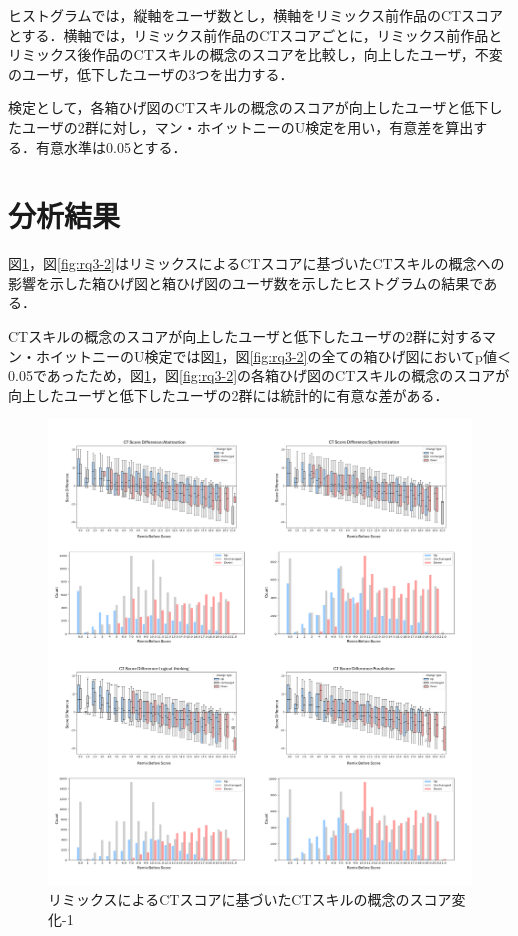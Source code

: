 \documentclass[11pt]{jreport}
\begin{document}
ヒストグラムでは，縦軸をユーザ数とし，横軸をリミックス前作品のCTスコアとする．横軸では，リミックス前作品のCTスコアごとに，リミックス前作品とリミックス後作品のCTスキルの概念のスコアを比較し，向上したユーザ，不変のユーザ，低下したユーザの3つを出力する．

検定として，各箱ひげ図のCTスキルの概念のスコアが向上したユーザと低下したユーザの2群に対し，マン・ホイットニーのU検定を用い，有意差を算出する．有意水準は0.05とする．

\section{分析結果}
図\ref{fig:rq3-1}，図\ref{fig:rq3-2}はリミックスによるCTスコアに基づいたCTスキルの概念への影響を示した箱ひげ図と箱ひげ図のユーザ数を示したヒストグラムの結果である．

CTスキルの概念のスコアが向上したユーザと低下したユーザの2群に対するマン・ホイットニーのU検定では図\ref{fig:rq3-1}，図\ref{fig:rq3-2}の全ての箱ひげ図においてp値＜0.05であったため，図\ref{fig:rq3-1}，図\ref{fig:rq3-2}の各箱ひげ図のCTスキルの概念のスコアが向上したユーザと低下したユーザの2群には統計的に有意な差がある．

\begin{figure}[h]
\centerline{\includegraphics[width=1.2\linewidth]{@BSthesis2024_Horio/BSthesis2024_Horio_fig/rq3-1.pdf}}
\caption{リミックスによるCTスコアに基づいたCTスキルの概念のスコア変化-1}
\label{fig:rq3-1}
\end{figure}
\end{document}
